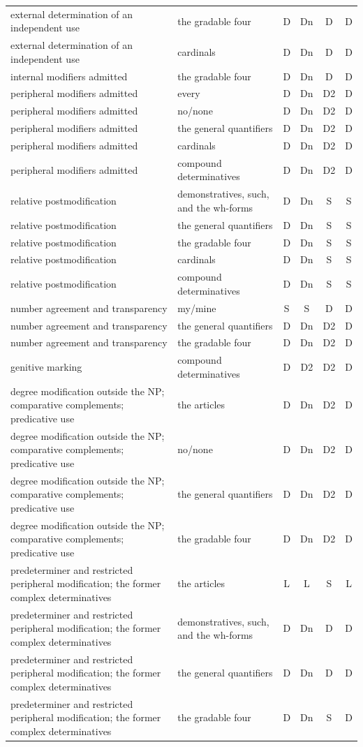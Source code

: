 {\begin{longtable}{>{\raggedright\arraybackslash}p{5.2cm}>{\raggedright\arraybackslash}p{4.2cm}cccc}
external determination of an independent use & the gradable four & D & Dn & D & D \\
external determination of an independent use & cardinals & D & Dn & D & D \\
internal modifiers admitted & the gradable four & D & Dn & D & D \\
peripheral modifiers admitted & every & D & Dn & D2 & D \\
peripheral modifiers admitted & no/none & D & Dn & D2 & D \\
peripheral modifiers admitted & the general quantifiers & D & Dn & D2 & D \\
peripheral modifiers admitted & cardinals & D & Dn & D2 & D \\
peripheral modifiers admitted & compound determinatives & D & Dn & D2 & D \\
relative postmodification & demonstratives, such, and the wh-forms & D & Dn & S & S \\
relative postmodification & the general quantifiers & D & Dn & S & S \\
relative postmodification & the gradable four & D & Dn & S & S \\
relative postmodification & cardinals & D & Dn & S & S \\
relative postmodification & compound determinatives & D & Dn & S & S \\
number agreement and transparency & my/mine & S & S & D & D \\
number agreement and transparency & the general quantifiers & D & Dn & D2 & D \\
number agreement and transparency & the gradable four & D & Dn & D2 & D \\
genitive marking & compound determinatives & D & D2 & D2 & D \\
degree modification outside the NP; comparative complements; predicative use & the articles & D & Dn & D2 & D \\
degree modification outside the NP; comparative complements; predicative use & no/none & D & Dn & D2 & D \\
degree modification outside the NP; comparative complements; predicative use & the general quantifiers & D & Dn & D2 & D \\
degree modification outside the NP; comparative complements; predicative use & the gradable four & D & Dn & D2 & D \\
predeterminer and restricted peripheral modification; the former complex determinatives & the articles & L & L & S & L \\
predeterminer and restricted peripheral modification; the former complex determinatives & demonstratives, such, and the wh-forms & D & Dn & D & D \\
predeterminer and restricted peripheral modification; the former complex determinatives & the general quantifiers & D & Dn & D & D \\
predeterminer and restricted peripheral modification; the former complex determinatives & the gradable four & D & Dn & S & D \\
\end{longtable}}

